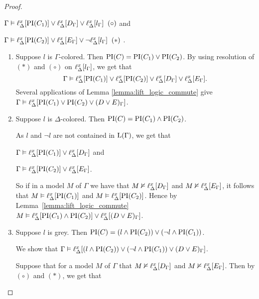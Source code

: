 \begin{proof}
\begin{indproof}
			$\Gamma \entails \lift{\Delta}{ \PI(C_1) }{x} \lor
			\lift{\Delta}{ D_\Gamma }{x} \lor
			\lift{\Delta}{ l_\Gamma }{x} \;\; {(\circ)} $
			and

			$\Gamma \entails \lift{\Delta}{ \PI(C_2) }{x} \lor
			\lift{\Delta}{ E_\Gamma }{x} \lor
			\lnot \lift{\Delta}{ l_\Gamma }{x} \;\; {(*)}$ .


			\begin{enumerate}
				\item Suppose $l$ is $\Gamma$-colored.
					Then $\PI(C) = \PI(C_1) \lor \PI(C_2)$.
					By using resolution of ${(*)}$ and ${(\circ)}$ on $\lift{\Delta}{l_\Gamma}{x}$, we get that 
					$$\Gamma \entails\lift{\Delta}{ \PI(C_1) }{x} \lor \lift{\Delta}{ \PI(C_2) }{x} \lor
					\lift{\Delta}{ D_\Gamma }{x} \lor
					\lift{\Delta}{ E_\Gamma }{x}.$$
					Several applications of Lemma \ref{lemma:lift_logic_commute} give
					$\Gamma \entails\lift{\Delta}{ \PI(C_1)  \lor  \PI(C_2) \lor (D \lor E)_\Gamma }{x}$.

				\item Suppose $l$ is $\Delta$-colored.
					Then $\PI(C) = \PI(C_1) \land \PI(C_2)$.

					As $l$ and $\lnot l$ are not contained in $\Lang(\Gamma)$, we get that 

					$\Gamma \entails \lift{\Delta}{ \PI(C_1) }{x} \lor
					\lift{\Delta}{ D_\Gamma }{x}$
					and

					$\Gamma \entails \lift{\Delta}{ \PI(C_2) }{x} \lor
					\lift{\Delta}{ E_\Gamma }{x}$.

					So if in a model $M$ of $\Gamma$ we have that
					$M \notentails \lift{\Delta}{ D_\Gamma }{x}$ and 
					$M \notentails \lift{\Delta}{ E_\Gamma }{x}$, it follows that $M \entails \lift{\Delta}{ \PI(C_1) }{x}$ and $M \entails \lift{\Delta}{ \PI(C_2) }{x}$. Hence by Lemma~\ref{lemma:lift_logic_commute}
					$M \entails \lift{\Delta}{ \PI(C_1) \land \PI(C_2) }{x} \lor
					\lift{\Delta}{ (D \lor E)_\Gamma }{x}$.

				\item Suppose $l$ is grey.
					Then $\PI(C) =  (l \land \PI(C_2)) \lor (\lnot l \land \PI(C_1))$.

					We show that 
					$\Gamma \entails \lift{\Delta}{(l \land \PI(C_2)) \lor (\lnot l \land \PI(C_1)) \lor (D \lor E)_\Gamma  }{x} $. 

					Suppose that for a model $M$ of $\Gamma$ that 
					$M \notentails \lift{\Delta}{ D_\Gamma }{x}$ and 
					$M \notentails \lift{\Delta}{ E_\Gamma }{x}$.
					Then by ${(\circ)}$
					and ${(*)}$, we get that\nopagebreak


\end{enumerate}
\end{indproof}
\end{proof}
